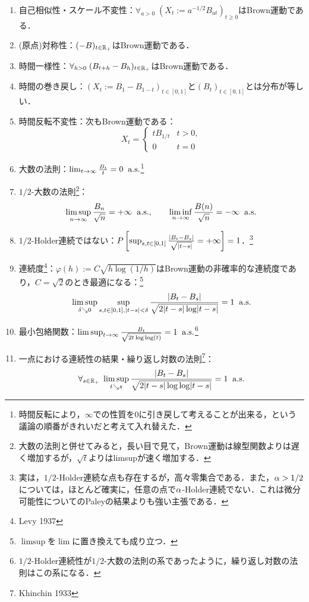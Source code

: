 \documentclass[uplatex,dvipdfmx]{jsreport}
\begin{document}
\begin{proposition}\mbox{}
    \begin{enumerate}
        \item 自己相似性・スケール不変性：$\forall_{a>0}\;(X_t:=a^{-1/2}B_{at})_{t\ge0}$はBrown運動である．
        \item (原点)対称性：$(-B)_{t\in\mathbb{R}_+}$はBrown運動である．
        \item 時間一様性：$\forall_{h>0}\;(B_{t+h}-B_h)_{t\in\mathbb{R}_+}$はBrown運動である．
        \item 時間の巻き戻し：$(X_t:=B_1-B_{1-t})_{t\in[0,1]}$と$(B_t)_{t\in[0,1]}$とは分布が等しい．
        \item 時間反転不変性：次もBrown運動である：
        \[X_t=\begin{cases}
            tB_{1/t}&t>0,\\0&t=0
        \end{cases}\]
        \item 大数の法則：$\lim_{t\to\infty}\frac{B_t}{t}=0\;\;\mathrm{a.s.}$\footnote{時間反転により，$\infty$での性質を$0$に引き戻して考えることが出来る，という議論の順番がきれいだと考えて入れ替えた．}        
        \item $1/2$-大数の法則\footnote{大数の法則と併せてみると，長い目で見て，Brown運動は線型関数よりは遅く増加するが，$\sqrt{t}$よりはlimsupが速く増加する．}：
        \[\limsup_{n\to\infty}\frac{B_n}{\sqrt{n}}=+\infty\;\;\mathrm{a.s.},\qquad\liminf_{n\to\infty}\frac{B(n)}{\sqrt{n}}=-\infty\;\;\mathrm{a.s.}\]
        \item $1/2$-Holder連続ではない：$P\left[\sup_{s,t\in[0,1]}\frac{\lvert B_t-B_s\rvert}{\sqrt{\lvert t-s\rvert}}=+\infty\right]=1$．\footnote{実は，$1/2$-Holder連続な点も存在するが，高々零集合である．また，$\alpha>1/2$については，ほとんど確実に，任意の点で$\alpha$-Holder連続でない．これは微分可能性についてのPaleyの結果よりも強い主張である．}
        \item 連続度\footnote{Levy 1937}：$\varphi(h):=C\sqrt{h\log(1/h)}$はBrown運動の非確率的な連続度であり，$C=\sqrt{2}$のとき最適になる：\footnote{$\limsup$を$\lim$に置き換えても成り立つ．}
        \[\limsup_{\delta\searrow 0}\sup_{s,t\in[0,1],\lvert t-s\rvert<\delta}\frac{\lvert B_t-B_s\rvert}{\sqrt{2\lvert t-s\rvert\log\lvert t-s\rvert}}=1\;\;\mathrm{a.s.}\]
        \item 最小包絡関数：$\limsup_{t\to\infty}\frac{B_t}{\sqrt{2t\log\log(t)}}=1\;\;\mathrm{a.s.}$\footnote{$1/2$-Holder連続性が$1/2$-大数の法則の系であったように，繰り返し対数の法則はこの系になる．}
        \item 一点における連続性の結果・繰り返し対数の法則\footnote{Khinchin 1933}：\[\forall_{s\in\mathbb{R}_+}\;\limsup_{t\searrow s}\frac{\lvert B_t-B_s\rvert}{\sqrt{2\lvert t-s\rvert\log\log\lvert t-s\rvert}}=1\;\;\mathrm{a.s.}\]

\end{enumerate}
\end{proposition}
\end{document}
